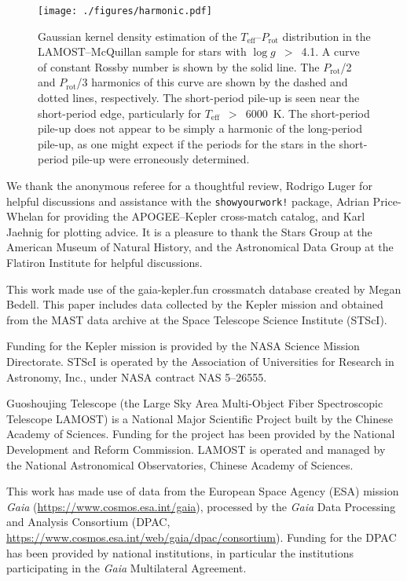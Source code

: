 \documentclass[linenumbers,trackchanges,twocolumn]{aastex631}
\newcommand{\lamostmcq}{LAMOST--McQuillan\xspace}
\newcommand{\teff}{\ensuremath{T_{\mathrm{eff}}}\xspace}
\newcommand{\logg}{\ensuremath{\log g}\xspace}
\newcommand{\prot}{\ensuremath{P_\mathrm{rot}}\xspace}
\begin{document}
\begin{figure}
    \centering
    \texttt{[image: ./figures/harmonic.pdf]}
    \caption{Gaussian kernel density estimation of the \teff–\prot distribution in the \lamostmcq sample for stars with \logg~$>$~4.1. A curve of constant Rossby number is shown by the solid line. The \prot/2 and \prot/3 harmonics of this curve are shown by the dashed and dotted lines, respectively. The short-period pile-up is seen near the short-period edge, particularly for \teff~$>$~6000~K. The short-period pile-up does not appear to be simply a harmonic of the long-period pile-up, as one might expect if the periods for the stars in the short-period pile-up were erroneously determined.}
    \label{fig:harmonic}    
\end{figure}


\begin{acknowledgments}
We thank the anonymous referee for a thoughtful review, Rodrigo Luger for helpful discussions and assistance with the \texttt{showyourwork!} package, Adrian Price-Whelan for providing the APOGEE--Kepler cross-match catalog, and Karl Jaehnig for plotting advice. It is a pleasure to thank the Stars Group at the American Museum of Natural History, and the Astronomical Data Group at the Flatiron Institute for helpful discussions. 

This work made use of the gaia-kepler.fun crossmatch database created by Megan Bedell. This paper includes data collected by the Kepler mission and obtained from the MAST data archive at the Space Telescope Science Institute (STScI). 

Funding for the Kepler mission is provided by the NASA Science Mission Directorate. STScI is operated by the Association of Universities for Research in Astronomy, Inc., under NASA contract NAS 5–26555. 

Guoshoujing Telescope (the Large Sky Area Multi-Object Fiber Spectroscopic Telescope LAMOST) is a National Major Scientific Project built by the Chinese Academy of Sciences. Funding for the project has been provided by the National Development and Reform Commission. LAMOST is operated and managed by the National Astronomical Observatories, Chinese Academy of Sciences. 

This work has made use of data from the European Space Agency (ESA) mission {\it Gaia} (\url{https://www.cosmos.esa.int/gaia}), processed by the {\it Gaia} Data Processing and Analysis Consortium (DPAC, \url{https://www.cosmos.esa.int/web/gaia/dpac/consortium}). Funding for the DPAC has been provided by national institutions, in particular the institutions participating in the {\it Gaia} Multilateral Agreement. 


\end{acknowledgments}
\end{document}

